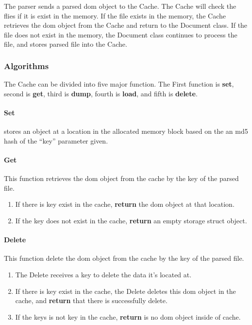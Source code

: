 The parser sends a parsed \gls{dom} object to the Cache. 
The Cache will check the flies if it is exist in the memory. 
If the file exists in the memory, the Cache retrieves the \gls{dom} object from the Cache and return to the Document class. 
If the file does not exist in the memory, the Document class continues to process the file, and stores parsed file into the Cache.

\subsubsection{Algorithms}

The Cache can be divided into five major function.
The First function is \textbf{set}, second is \textbf{get}, third is \textbf{dump}, fourth is \textbf{load}, and fifth is \textbf{delete}.

\paragraph{Set} stores an object at a location in the allocated memory block based on the an \gls{md5} hash of the ``key'' parameter given.

\paragraph{Get} This function retrieves the \gls{dom} object from the cache by the key of the parsed file.

\begin{enumerate}
    \item If there is key exist in the cache, \textbf{return} the \gls{dom} object at that location.
    \item If the key does not exist in the cache, \textbf{return} an empty storage struct object.
\end{enumerate}

\paragraph{Delete} This function delete the \gls{dom} object from the cache by the key of the parsed file.

\begin{enumerate}
    \item The Delete receives a key to delete the data it's located at.
    \item If there is key exist in the cache, the Delete deletes this \gls{dom} object in the cache, and \textbf{return} that there is successfully delete.
    \item If the keys is not key in the cache, \textbf{return} is no \gls{dom} object inside of cache.
\end{enumerate}

